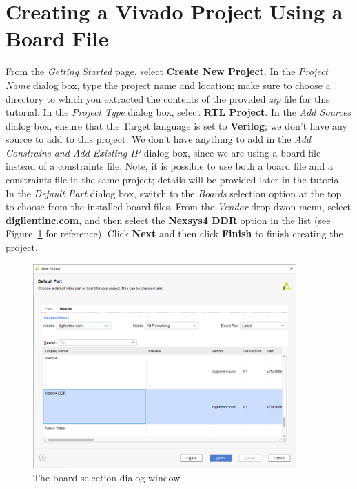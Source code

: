 \documentclass[11pt]{article}
\begin{document}
\section{Creating a Vivado Project Using a Board File}
\label{sec:create_proj}
From the \textit{Getting Started} page, select \textbf{Create New Project}. In the \textit{Project Name} dialog box, type the project name and location; make sure to choose a directory to which you extracted the contents of the provided \textit{zip} file for this tutorial. In the \textit{Project Type} dialog box, select \textbf{RTL Project}. In the \textit{Add Sources} dialog box, ensure that the Target language is set to \textbf{Verilog}; we don't have any source to add to this project. We don't have anything to add in the \textit{Add Constrains and Add Existing IP} dialog box, since we are using a board file instead of a constraints file. Note, it is possible to use both a board file and a constraints file in the same project; details will be provided later in the tutorial. In the \textit{Default Part} dialog box, switch to the \textit{Boards} selection option at the top to choose from the installed board files. From the \textit{Vendor} drop-dwon menu, select \textbf{digilentinc.com}, and then select the \textbf{Nexsys4 DDR} option in the list (see Figure~\ref{fig:board_select} for reference). Click \textbf{Next} and then click \textbf{Finish} to finish creating the project.

\begin{figure}[!h]
    \centering
    \includegraphics[width=0.9\textwidth]{images/board_select.png}
    \caption{The board selection dialog window}
    \label{fig:board_select}
\end{figure}
\end{document}
